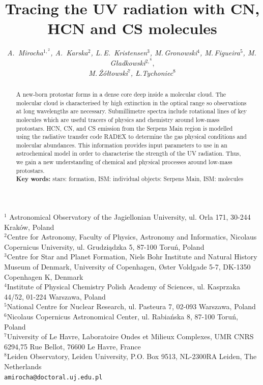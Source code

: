 \documentclass[a4paper]{article}
\begin{document}
\fontsize{11}{11}\selectfont %
\title{Tracing the UV radiation with CN, HCN and CS molecules}
\author{\textsl{A.~Mirocha$^{1,}^{2}$, A.~Karska$^{2}$, L.\,E.~Kristensen$^{3}$, M.\,Gronowski$^{4}$, M.\,Figueira$^{5}$, M.\, Gładkowski$^{2,}^{6}$}, \\ \textsl{M.\,Żółtowski$^{7}$, Ł.Tychoniec$^{8}$}}
\date{\vspace*{-6ex}}
\maketitle
\begin{center} {\small $^{1}$ Astronomical Observatory of the Jagiellonian University, ul. Orla 171, 30-244 Kraków, Poland\\
$^{2}$Centre for Astronomy, Faculty of Physics, Astronomy and Informatics, Nicolaus Copernicus University, ul. Grudziądzka 5, 87-100 Toruń, Poland\\
$^{3}$Centre for Star and Planet Formation, Niels Bohr Institute and Natural History Museum of Denmark, University of Copenhagen, Øster Voldgade 5-7, DK-1350 Copenhagen K, Denmark\\
$^{4}$Institute of Physical Chemistry Polish Academy of Sciences, ul. Kasprzaka 44/52, 01-224 Warszawa, Poland\\
$^{5}$National Centre for Nuclear Research, ul. Pasteura 7, 02-093 Warszawa, Poland\\
$^{6}$Nicolaus Copernicus Astronomical Center, ul. Rabiańska 8, 87-100 Toruń, Poland\\
$^{7}$University of Le Havre, Laboratoire Ondes et Milieux Complexes, UMR CNRS 6294,75 Rue Bellot, 76600 Le Havre, France\\
$^{8}$Leiden Observatory, Leiden University, P.O. Box 9513, NL-2300RA Leiden, The Netherlands\\
{\tt amirocha@doctoral.uj.edu.pl}}
\end{center}

\begin{abstract}
A new-born protostar forms in a dense core deep inside a molecular cloud. The molecular cloud is characterised by high extinction in the optical range so observations at long wavelengths are necessary. Submillimetre spectra include rotational lines of key molecules which are useful tracers of physics and chemistry around low-mass protostars. HCN, CN, and CS emission from the Serpens Main region is modelled using the radiative transfer code RADEX to determine the gas physical conditions and molecular abundances. This information provides input parameters to use in an astrochemical model in order to characterise the strength of the UV radiation. Thus, we gain a new understanding of chemical and physical processes around low-mass protostars.\\[1ex]
{\bf Key words:} stars: formation, ISM: individual objects: Serpens Main, ISM: molecules
\end{abstract}
\end{document}
